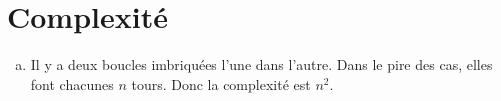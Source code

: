 \section{Complexité}
\begin{enumerate}[(a)]
  \item {}

        Il y a deux boucles imbriquées l'une dans l'autre. Dans le pire des cas, elles
        font chacunes $n$ tours.
        Donc la complexité est $n^2$.
\end{enumerate}
